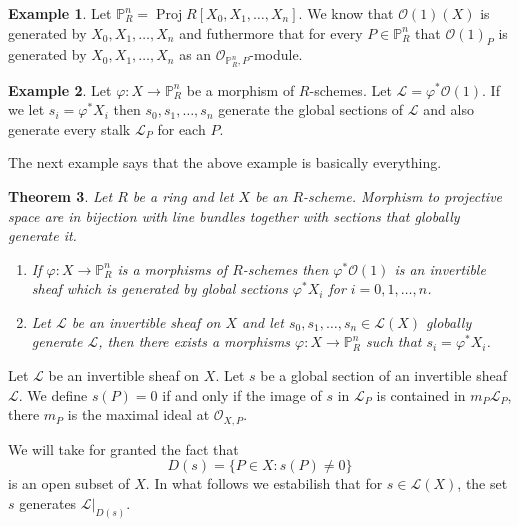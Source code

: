 \documentclass[12pt]{article}
\numberwithin{equation}{section}
\newtheorem{theorem}{Theorem}[subsection]
\theoremstyle{definition}
\newtheorem{example}[theorem]{Example}
\theoremstyle{remark}
\newcommand{\Ocal}{\mathcal{O}}
\newcommand{\PP}{\mathbb{P}}
\newcommand{\Proj}{\operatorname{Proj}}
\newcommand{\Lcal}{\mathcal{L}}
\begin{document}
\begin{example}
	Let $\PP^n_R = \Proj R[X_0,X_1,\ldots,X_n]$. 
	We know that $\Ocal(1)(X)$ is generated by $X_0,X_1,\ldots,X_n$ and futhermore that for every $P\in \PP^n_R$ that $\Ocal(1)_P$ is generated by $X_0,X_1,\ldots, X_n$ as an $\Ocal_{\PP^n_R,P}$-module.
\end{example}

\begin{example}
	Let $\varphi: X \to \PP^n_R$ be a morphism of $R$-schemes. 
	Let $\Lcal = \varphi^*\Ocal(1)$. 
	If we let $s_i = \varphi^*X_i$ then $s_0,s_1,\ldots,s_n$ generate the global sections of $\Lcal$ and also generate every stalk $\Lcal_P$ for each $P$. 
\end{example}
The next example says that the above example is basically everything. 

\begin{theorem}\label{thm:maps-to-projective-space}
	Let $R$ be a ring and let $X$ be an $R$-scheme. 
	Morphism to projective space are in bijection with line bundles together with sections that globally generate it. 
	\begin{enumerate}
		\item If $\varphi:X \to \PP^n_R$ is a morphisms of $R$-schemes then $\varphi^* \Ocal(1)$ is an invertible sheaf which is generated by global sections $\varphi^* X_i$ for $i=0,1,\ldots,n$. 
		\item Let $\Lcal$ be an invertible sheaf on $X$ and let $s_0,s_1,\ldots,s_n \in \Lcal(X)$ globally generate $\Lcal$, then there exists a morphisms $\varphi: X \to \PP^n_R$ such that $s_i = \varphi^*X_i$.
	\end{enumerate}
\end{theorem}

Let $\Lcal$ be an invertible sheaf on $X$. 
Let $s$ be a global section of an invertible sheaf $\Lcal$.	
We define $s(P)=0$ if and only if the image of $s$ in $\Lcal_P$ is contained in $m_P\Lcal_P$, there $m_P$ is the maximal ideal at $\Ocal_{X,P}$.

We will take for granted the fact that 
$$D(s) = \lbrace P \in X \colon s(P)\neq 0 \rbrace $$ 
is an open subset of $X$.
In what follows we estabilish that for $s \in \Lcal(X)$, the set $s$ generates $\Lcal\vert_{D(s)}$.
\end{document}
